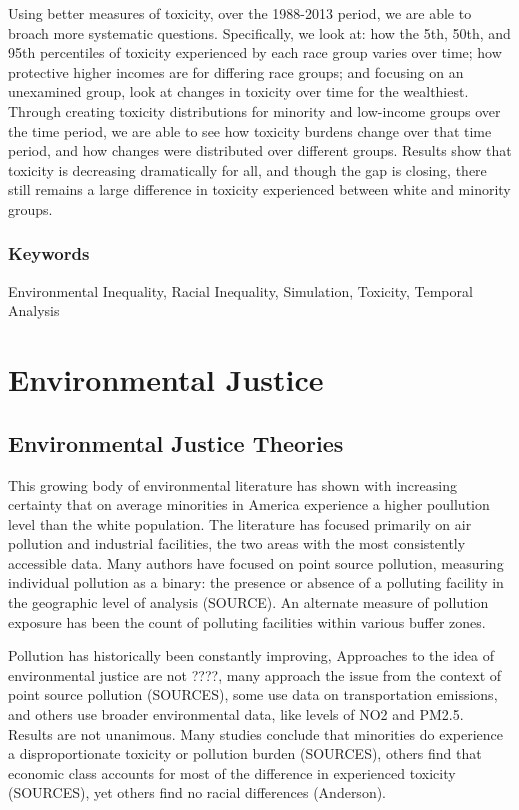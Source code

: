 \documentclass[12pt,twoside]{dukestatscithesis}
\theoremstyle{definition}
\theoremstyle{definition}
\theoremstyle{definition}
\theoremstyle{remark}
\begin{document}
Using better measures of toxicity, over the 1988-2013 period, we are
able to broach more systematic questions. Specifically, we look at: how
the 5th, 50th, and 95th percentiles of toxicity experienced by each race
group varies over time; how protective higher incomes are for differing
race groups; and focusing on an unexamined group, look at changes in
toxicity over time for the wealthiest. Through creating toxicity
distributions for minority and low-income groups over the time period,
we are able to see how toxicity burdens change over that time period,
and how changes were distributed over different groups. Results show
that toxicity is decreasing dramatically for all, and though the gap is
closing, there still remains a large difference in toxicity experienced
between white and minority groups.

\subsection*{Keywords}\label{keywords}

Environmental Inequality, Racial Inequality, Simulation, Toxicity,
Temporal Analysis

\chapter{Environmental Justice}\label{env_justice}

\section{Environmental Justice
Theories}\label{environmental-justice-theories}

This growing body of environmental literature has shown with increasing
certainty that on average minorities in America experience a higher
poullution level than the white population. The literature has focused
primarily on air pollution and industrial facilities, the two areas with
the most consistently accessible data. Many authors have focused on
point source pollution, measuring individual pollution as a binary: the
presence or absence of a polluting facility in the geographic level of
analysis (SOURCE). An alternate measure of pollution exposure has been
the count of polluting facilities within various buffer zones.

Pollution has historically been constantly improving, Approaches to the
idea of environmental justice are not ????, many approach the issue from
the context of point source pollution (SOURCES), some use data on
transportation emissions, and others use broader environmental data,
like levels of NO2 and PM2.5. Results are not unanimous. Many studies
conclude that minorities do experience a disproportionate toxicity or
pollution burden (SOURCES), others find that economic class accounts for
most of the difference in experienced toxicity (SOURCES), yet others
find no racial differences (Anderson).
\end{document}
